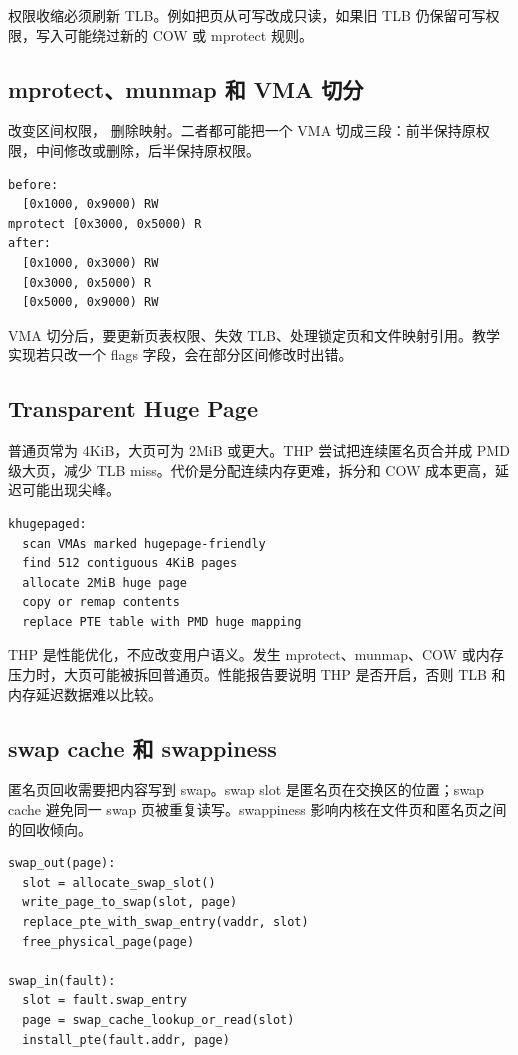 权限收缩必须刷新 TLB。例如把页从可写改成只读，如果旧 TLB 仍保留可写权限，写入可能绕过新的 COW 或 mprotect 规则。

\subsection{mprotect、munmap 和 VMA 切分}

 改变区间权限， 删除映射。二者都可能把一个 VMA 切成三段：前半保持原权限，中间修改或删除，后半保持原权限。

\begin{lstlisting}
before:
  [0x1000, 0x9000) RW
mprotect [0x3000, 0x5000) R
after:
  [0x1000, 0x3000) RW
  [0x3000, 0x5000) R
  [0x5000, 0x9000) RW
\end{lstlisting}

VMA 切分后，要更新页表权限、失效 TLB、处理锁定页和文件映射引用。教学实现若只改一个 flags 字段，会在部分区间修改时出错。

\subsection{Transparent Huge Page}

普通页常为 4KiB，大页可为 2MiB 或更大。THP 尝试把连续匿名页合并成 PMD 级大页，减少 TLB miss。代价是分配连续内存更难，拆分和 COW 成本更高，延迟可能出现尖峰。

\begin{lstlisting}
khugepaged:
  scan VMAs marked hugepage-friendly
  find 512 contiguous 4KiB pages
  allocate 2MiB huge page
  copy or remap contents
  replace PTE table with PMD huge mapping
\end{lstlisting}

THP 是性能优化，不应改变用户语义。发生 mprotect、munmap、COW 或内存压力时，大页可能被拆回普通页。性能报告要说明 THP 是否开启，否则 TLB 和内存延迟数据难以比较。

\subsection{swap cache 和 swappiness}

匿名页回收需要把内容写到 swap。swap slot 是匿名页在交换区的位置；swap cache 避免同一 swap 页被重复读写。swappiness 影响内核在文件页和匿名页之间的回收倾向。

\begin{lstlisting}
swap_out(page):
  slot = allocate_swap_slot()
  write_page_to_swap(slot, page)
  replace_pte_with_swap_entry(vaddr, slot)
  free_physical_page(page)

swap_in(fault):
  slot = fault.swap_entry
  page = swap_cache_lookup_or_read(slot)
  install_pte(fault.addr, page)
\end{lstlisting}

